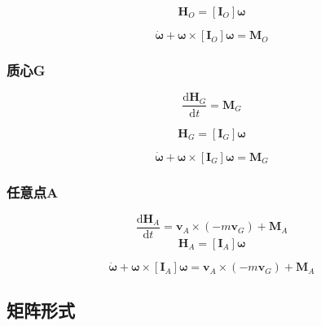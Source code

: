 \begin{equation}
  \bm{H}_O=[\bm{I}_O]\bm{\omega}
\end{equation}

\begin{definition}
  \begin{equation}
    [\bm{I}_O]\dot{\bm{\omega}}+\bm{\omega}\times[\bm{I}_O]\bm{\omega}=\bm{M}_O
  \end{equation}
\end{definition}

\subsubsection*{质心G}
\begin{equation}
  \frac{\mathrm{d}\bm{H}_G}{\mathrm{d}t}=\bm{M}_G
\end{equation}

\begin{equation}
  \bm{H}_G=[\bm{I}_G]\bm{\omega}
\end{equation}

\begin{definition}
  \begin{equation}
    [\bm{I}_G]\dot{\bm{\omega}}+\bm{\omega}\times[\bm{I}_G]\bm{\omega}=\bm{M}_G
  \end{equation}
\end{definition}

\subsubsection*{任意点A}
\begin{equation}
  \frac{\mathrm{d}\bm{H}_A}{\mathrm{d}t}=\bm{v}_A\times(-m\bm{v}_G)+\bm{M}_A
\end{equation}
\begin{equation}
  \bm{H}_A=[\bm{I}_A]\bm{\omega}
\end{equation}

\begin{definition}
  \begin{equation}
    [\bm{I}_A]\dot{\bm{\omega}}+\bm{\omega}\times[\bm{I}_A]\bm{\omega}=\bm{v}_A\times(-m\bm{v}_G)+\bm{M}_A
  \end{equation}
\end{definition}

\subsection{矩阵形式}
